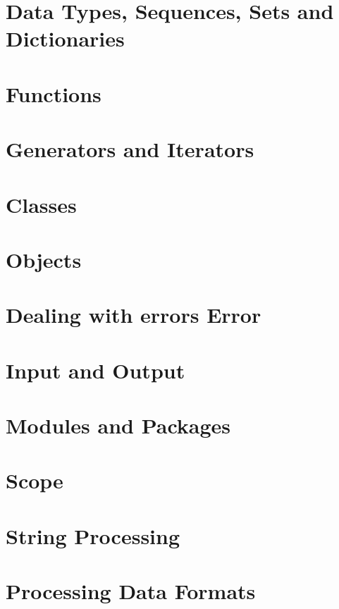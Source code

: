 \documentclass{article}
\begin{document}
\section{Data Types, Sequences, Sets and Dictionaries}
\section{Functions}
\section{Generators and Iterators}
\section{Classes}
\section{Objects}
\section{Dealing with errors Error}
\section{Input and Output}
\section{Modules and Packages}
\section{Scope}
\section{String Processing}
\section{Processing Data Formats}
\end{document}
